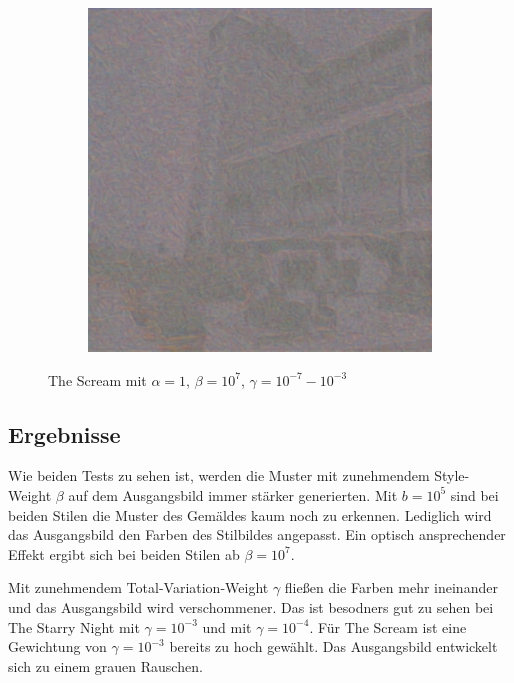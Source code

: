 \begin{figure}[H]
\begin{subfigure}[h]{0.15\textwidth}
    \end{subfigure}
    \begin{subfigure}[h]{0.15\textwidth}
        \centering
        \includegraphics[width=\textwidth]{resources/content/experiments/b__the_scream__768x768__style-weight_1e+07__tv-weight_1e-03.jpg}
    \end{subfigure}
    \caption{The Scream mit $ \alpha = 1 $, $ \beta = 10^{7} $, $ \gamma = 10^{-7} - 10^{-3} $}
\end{figure}

\pagebreak

\subsection{Ergebnisse}

Wie beiden Tests zu sehen ist, werden die Muster mit zunehmendem Style-Weight $ \beta $ auf dem Ausgangsbild immer stärker generierten. Mit $ b = 10^{5} $ sind bei beiden Stilen die Muster des Gemäldes kaum noch zu erkennen. Lediglich wird das Ausgangsbild den Farben des Stilbildes angepasst. Ein optisch ansprechender Effekt ergibt sich bei beiden Stilen ab $ \beta = 10^{7} $. 

Mit zunehmendem Total-Variation-Weight $ \gamma $ fließen die Farben mehr ineinander und das Ausgangsbild wird verschommener. Das ist besodners gut zu sehen bei The Starry Night mit $ \gamma = 10^{-3} $ und  mit $ \gamma = 10^{-4} $. Für The Scream ist eine Gewichtung von $ \gamma = 10^{-3} $ bereits zu hoch gewählt. Das Ausgangsbild entwickelt sich zu einem grauen Rauschen.


